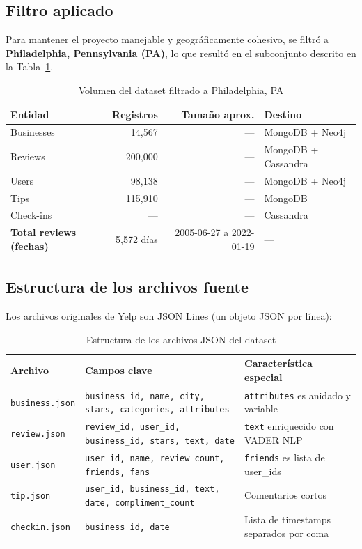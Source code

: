 \documentclass[12pt,a4paper]{article}
\begin{document}
\subsection{Filtro aplicado}

Para mantener el proyecto manejable y geográficamente cohesivo, se filtró a
\textbf{Philadelphia, Pennsylvania (PA)}, lo que resultó en el subconjunto descrito
en la Tabla~\ref{tab:dataset}.

\begin{table}[H]
\centering
\caption{Volumen del dataset filtrado a Philadelphia, PA}
\label{tab:dataset}
\begin{tabular}{lrrl}
\toprule
\textbf{Entidad} & \textbf{Registros} & \textbf{Tamaño aprox.} & \textbf{Destino} \\
\midrule
Businesses & 14,567 & — & MongoDB + Neo4j \\
Reviews    & 200,000 & — & MongoDB + Cassandra \\
Users      & 98,138 & — & MongoDB + Neo4j \\
Tips       & 115,910 & — & MongoDB \\
Check-ins  & — & — & Cassandra \\
\midrule
\textbf{Total reviews (fechas)} & 5,572 días & 2005-06-27 a 2022-01-19 & — \\
\bottomrule
\end{tabular}
\end{table}

\subsection{Estructura de los archivos fuente}

Los archivos originales de Yelp son JSON Lines (un objeto JSON por línea):

\begin{table}[H]
\centering
\caption{Estructura de los archivos JSON del dataset}
\begin{tabular}{p{2.5cm} p{6.5cm} p{5cm}}
\toprule
\textbf{Archivo} & \textbf{Campos clave} & \textbf{Característica especial} \\
\midrule
\texttt{business.json} & \texttt{business\_id, name, city, stars, categories, attributes} & \texttt{attributes} es anidado y variable \\
\texttt{review.json} & \texttt{review\_id, user\_id, business\_id, stars, text, date} & \texttt{text} enriquecido con VADER NLP \\
\texttt{user.json} & \texttt{user\_id, name, review\_count, friends, fans} & \texttt{friends} es lista de user\_ids \\
\texttt{tip.json} & \texttt{user\_id, business\_id, text, date, compliment\_count} & Comentarios cortos \\
\texttt{checkin.json} & \texttt{business\_id, date} & Lista de timestamps separados por coma \\
\bottomrule
\end{tabular}
\end{table}
\end{document}
